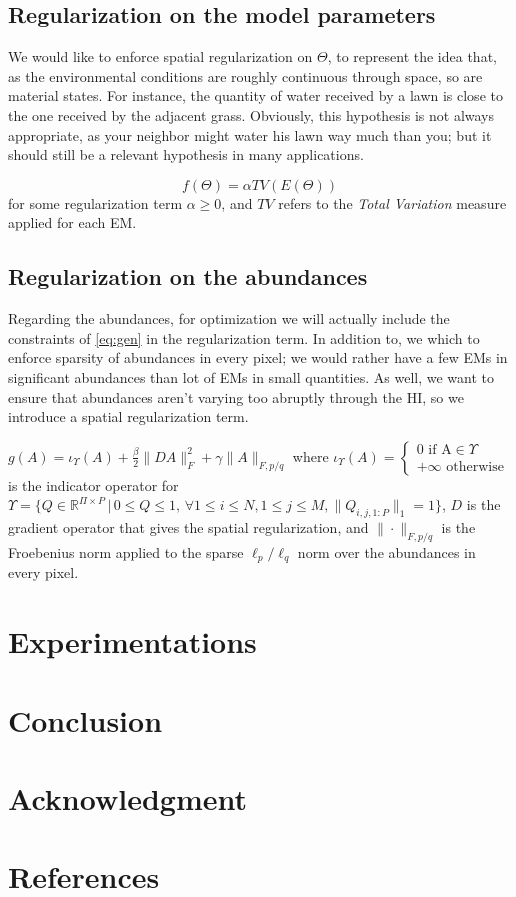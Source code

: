 \documentclass[conference]{IEEEtran}
\begin{document}
\subsection{Regularization on the model parameters}
We would like to enforce spatial regularization on $\Theta$, to represent the idea that, as the environmental conditions are roughly continuous through space, so are material states. For instance, the quantity of water received by a lawn is close to the one received by the adjacent grass. Obviously, this hypothesis is not always appropriate, as your neighbor might water his lawn way much than you; but it should still be a relevant hypothesis in many applications.

$$f(\Theta) = \alpha TV(E(\Theta))$$ for some regularization term $\alpha \geq 0$, and $TV$ refers to the \emph{Total Variation} measure applied for each EM.

\subsection{Regularization on the abundances}
Regarding the abundances, for optimization we will actually include the constraints of \ref{eq:gen} in the regularization term. In addition to, we which to enforce sparsity of abundances in every pixel; we would rather have a few EMs in significant abundances than lot of EMs in small quantities. As well, we want to ensure that abundances aren't varying too abruptly through the HI, so we introduce a spatial regularization term.

$g(A) = \iota_\Upsilon(A) + \frac{\beta}{2} \|DA\|_F^2 + \gamma \| A \|_{F, p/q}$ where $\iota_\Upsilon (A) = \begin{cases} 0 \text{ if A}\in \Upsilon\\ +\infty \text{ otherwise} \end{cases}$ is the indicator operator for $\Upsilon = \{Q \in \mathbb{R}^{\Pi \times P}\, |\, 0 \leq Q \leq 1,\, \forall 1 \leq i \leq N, 1 \leq j \leq M, \| Q_{i, j, 1:P} \|_1 = 1\}$, $D$ is the gradient operator that gives the spatial regularization, and $\| \cdot \|_{F, p/q}$ is the Froebenius norm applied to the sparse $\ell_p/\ell_q$ norm over the abundances in every pixel.

\section{Experimentations}

\section{Conclusion}

\section*{Acknowledgment}

\section*{References}



\end{document}
